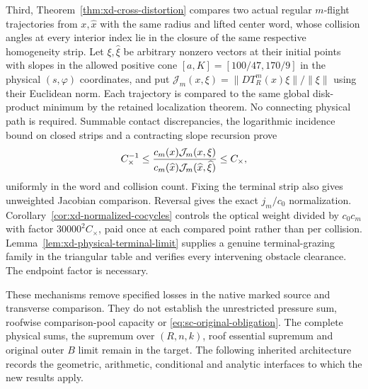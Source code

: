 Third, Theorem~\ref{thm:xd-cross-distortion} compares two actual
regular $m$-flight trajectories from $x,\widehat x$ with the same
radius and lifted center word, whose collision angles at every
interior index lie in the closure of the same respective homogeneity
strip. Let $\xi,\widehat\xi$ be arbitrary nonzero vectors at their
initial points with slopes in the allowed positive cone
$[a,K]=[100/47,170/9]$ in the physical $(s,\varphi)$ coordinates,
and put $\mathcal J_m(x,\xi)=\|DT_R^m(x)\xi\|/\|\xi\|$
using their Euclidean norm.
Each trajectory is compared to the same global disk-product minimum
by the retained localization theorem. No connecting physical path
is required. Summable contact
discrepancies, the logarithmic incidence bound on closed strips and
a contracting slope recursion prove
\[
 C_\times^{-1}\le
 {c_m(x)\mathcal J_m(x,\xi)\over
  c_m(\widehat x)\mathcal J_m(\widehat x,\widehat\xi)}
       \le C_\times,
\]
uniformly in the word and collision count. Fixing the terminal strip
also gives unweighted Jacobian comparison. Reversal gives the exact
$j_m/c_0$ normalization. Corollary~\ref{cor:xd-normalized-cocycles}
controls the optical weight divided by $c_0c_m$ with factor
$30000^2C_\times$, paid once at each compared point rather than
per collision. Lemma~\ref{lem:xd-physical-terminal-limit} supplies a
genuine terminal-grazing family in the triangular table and verifies
every intervening obstacle clearance. The endpoint factor is necessary.

These mechanisms remove specified losses in the native marked source
and transverse comparison. They do not establish the unrestricted
pressure sum, roofwise comparison-pool capacity or
\eqref{eq:sc-original-obligation}. The complete physical sums,
the supremum over $(R,n,k)$, roof essential supremum and original
outer $B$ limit remain in the target. The following inherited
architecture records the geometric, arithmetic, conditional and
analytic interfaces to which the new results apply.
